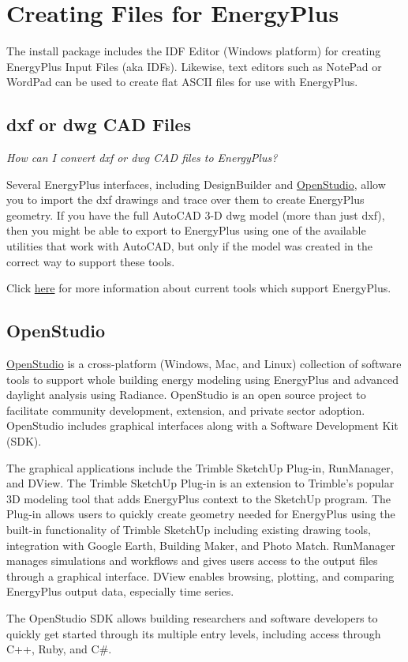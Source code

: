 \section{Creating Files for EnergyPlus}\label{creating-files-for-energyplus}

The install package includes the IDF Editor (Windows platform) for creating EnergyPlus Input Files (aka IDFs).
Likewise, text editors such as NotePad or WordPad can be used to create flat ASCII files for use with EnergyPlus.

\subsection{dxf or dwg CAD Files}\label{dxf-or-dwg-cad-files}

\emph{How can I convert dxf or dwg CAD files to EnergyPlus?}

Several EnergyPlus interfaces, including DesignBuilder and \href{https://www.openstudio.net/}{OpenStudio}, allow you to import the dxf drawings and trace over them to create EnergyPlus geometry. If you have the full AutoCAD 3-D dwg model (more than just dxf), then you might be able to export to EnergyPlus using one of the available utilities that work with AutoCAD, but only if the model was created in the correct way to support these tools.

Click \href{https://www.buildingenergysoftwaretools.com/?keys=EnergyPlus}{here} for more information about current tools which support EnergyPlus.

\subsection{OpenStudio}\label{openstudio}

\href{https://www.openstudio.net/}{OpenStudio} is a cross-platform (Windows, Mac, and Linux) collection of software tools to support whole building energy modeling using EnergyPlus and advanced daylight analysis using Radiance. OpenStudio is an open source project to facilitate community development, extension, and private sector adoption. OpenStudio includes graphical interfaces along with a Software Development Kit (SDK).

The graphical applications include the Trimble SketchUp Plug-in, RunManager, and DView.
The Trimble SketchUp Plug-in is an extension to Trimble’s popular 3D modeling tool that adds EnergyPlus context to the SketchUp program.
The Plug-in allows users to quickly create geometry needed for EnergyPlus using the built-in functionality of Trimble SketchUp including existing drawing tools, integration with Google Earth, Building Maker, and Photo Match.
RunManager manages simulations and workflows and gives users access to the output files through a graphical interface.
DView enables browsing, plotting, and comparing EnergyPlus output data, especially time series.

The OpenStudio SDK allows building researchers and software developers to quickly get started through its multiple entry levels, including access through C++, Ruby, and C#.
